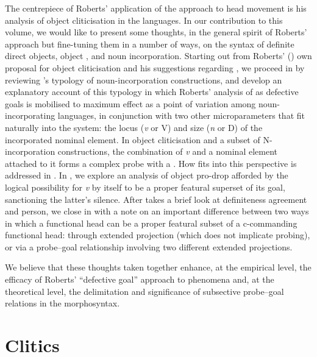 \documentclass[output=paper]{langsci/langscibook}
\newcommand{\posscite}[1]{\citeauthor{#1}'s \citeyearpar{#1}}
\begin{document}
\begin{refcontext}
The centrepiece of Roberts' application of the  approach to head
movement is his analysis of object cliticisation in the  languages. In
our contribution to this volume, we would like to present some thoughts, in the
general spirit of Roberts’ approach but fine-tuning them in a number of ways,
on the syntax of definite direct objects, object , and noun
incorporation. Starting out from Roberts' (\citeyear{Roberts2010}) own proposal
for object cliticisation and his suggestions regarding , we
proceed in  by reviewing \posscite{mithun84} typology of
noun-incorporation constructions, and develop an explanatory account of this
typology in which Roberts' analysis of  as defective goals is mobilised
to maximum effect as a point of variation among noun-incorporating languages,
in conjunction with two other microparameters that fit naturally into the
system: the locus (\emph{v} or V) and size (\emph{n} or D) of the incorporated
nominal element. In object cliticisation and a subset of N-incorporation
constructions, the combination of \emph{v} and a nominal element attached to it
forms a complex probe with a . How  fits into this
perspective is addressed in . In , we
explore an analysis of object pro-drop afforded by the logical possibility for
\emph{v} by itself to be a proper featural superset of its goal, sanctioning
the latter's silence. After  takes a brief look at
definiteness agreement and person, we close in  with a note
on an important difference between two ways in which a functional head can be a
proper featural subset of a c-commanding functional head: through extended
projection (which does not implicate probing), or via a probe--goal relationship
involving two different extended projections.

We believe that these thoughts taken together enhance, at the empirical level,
the efficacy of Roberts' \enquote{defective goal} approach to 
phenomena and, at the theoretical level, the delimitation and significance of
subsective probe--goal relations in the morphosyntax.

\section{Clitics}
\label{sec:16.1}


\end{refcontext}
\end{document}
